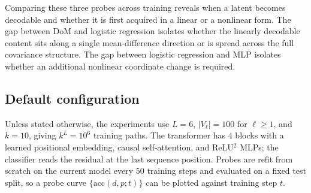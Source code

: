 Comparing these three probes across training reveals when a latent becomes
decodable and whether it is first acquired in a linear or a nonlinear form.
The gap between DoM and logistic regression isolates whether the linearly
decodable content sits along a single mean-difference direction or is spread
across the full covariance structure. The gap between logistic regression and
MLP isolates whether an additional nonlinear coordinate change is required.

\subsection*{Default configuration}

Unless stated otherwise, the experiments use $L = 6$, $|V_\ell| = 100$ for
$\ell \geq 1$, and $k = 10$, giving $k^L = 10^6$ training paths. The
transformer has $4$ blocks with a learned positional embedding, causal
self-attention, and ReLU$^2$ MLPs; the classifier reads the residual at the
last sequence position. Probes are refit from scratch on the current model
every $50$ training steps and evaluated on a fixed test split, so a probe
curve $\{\mathrm{acc}(d, p; t)\}$ can be plotted against training step $t$.
